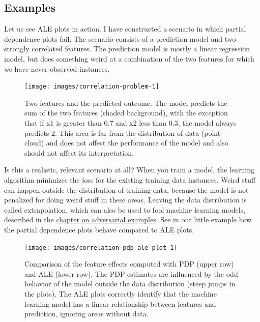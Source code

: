 \documentclass[
  12pt,
]{krantz}
\begin{document}
\hypertarget{examples-1}{%
\subsection{Examples}\label{examples-1}}

Let us see ALE plots in action.
I have constructed a scenario in which partial dependence plots fail.
The scenario consists of a prediction model and two strongly correlated features.
The prediction model is mostly a linear regression model, but does something weird at a combination of the two features for which we have never observed instances.

\begin{figure}

{\centering \texttt{[image: images/correlation-problem-1]} 

}

\caption{Two features and the predicted outcome. The model predicts the sum of the two features (shaded background), with the exception that if x1 is greater than 0.7 and x2 less than 0.3, the model always predicts 2. This area is far from the distribution of data (point cloud) and does not affect the performance of the model and also should not affect its interpretation.}\label{fig:correlation-problem}
\end{figure}

Is this a realistic, relevant scenario at all?
When you train a model, the learning algorithm minimizes the loss for the existing training data instances.
Weird stuff can happen outside the distribution of training data, because the model is not penalized for doing weird stuff in these areas.
Leaving the data distribution is called extrapolation, which can also be used to fool machine learning models, described in the \protect\hyperlink{adversarial}{chapter on adversarial examples}.
See in our little example how the partial dependence plots behave compared to ALE plots.

\begin{figure}

{\centering \texttt{[image: images/correlation-pdp-ale-plot-1]} 

}

\caption{Comparison of the feature effects computed with PDP (upper row) and ALE (lower row). The PDP estimates are influenced by the odd behavior of the model outside the data distribution (steep jumps in the plots). The ALE plots correctly identify that the machine learning model has a linear relationship between features and prediction, ignoring areas without data.}\label{fig:correlation-pdp-ale-plot}
\end{figure}
\end{document}
